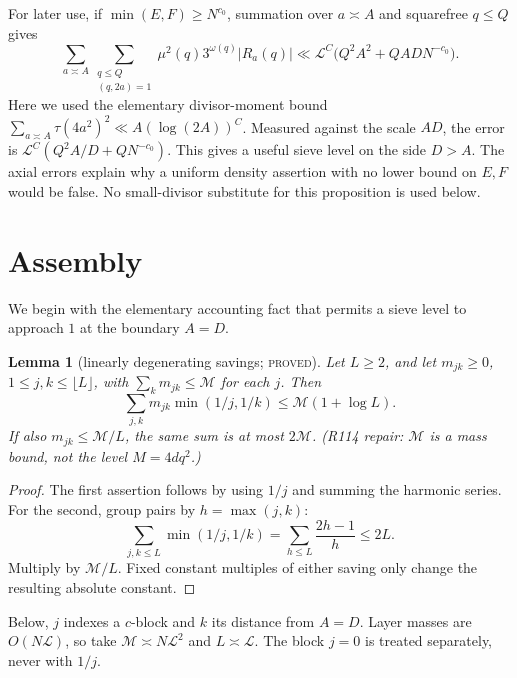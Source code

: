 \documentclass[10pt,reqno]{amsart}
\newtheorem{lemma}[theorem]{Lemma}
\theoremstyle{definition}
\numberwithin{equation}{section}
\newcommand{\cL}{\mathcal L}
\newcommand{\status}[1]{\textup{\textsc{#1}}}
\begin{document}
For later use, if $\min(E,F)\geq N^{c_0}$, summation over $a\asymp A$
and squarefree $q\leq Q$ gives
\begin{equation}\label{C:eq:Ka-summed}
 \sum_{a\asymp A}\sum_{\substack{q\leq Q\\(q,2a)=1}}
 \mu^2(q)3^{\omega(q)}|R_a(q)|
 \ll\cL^C\bigl(Q^2A^2+QADN^{-c_0}\bigr).
\end{equation}
Here we used the elementary divisor-moment bound
$\sum_{a\asymp A}\tau(4a^2)^2\ll A(\log(2A))^C$.
Measured against the scale $AD$, the error is
$\cL^C(Q^2A/D+QN^{-c_0})$.  This gives a useful sieve level on the
side $D>A$.  The axial errors explain why a uniform density assertion
with no lower bound on $E,F$ would be false.  No small-divisor substitute
for this proposition is used below.

\section{Assembly}\label{sec:assembly}
We begin with the elementary accounting fact that permits a sieve level
to approach $1$ at the boundary $A=D$.

\begin{lemma}[linearly degenerating savings; \status{proved}]\label{L:1.1}
Let $L\geq2$, and let $m_{jk}\geq0$, $1\leq j,k\leq\lfloor L\rfloor$,
with $\sum_km_{jk}\leq\mathcal M$ for each $j$.  Then
\[
 \sum_{j,k}m_{jk}\min(1/j,1/k)\leq\mathcal M(1+\log L).
\]
If also $m_{jk}\leq\mathcal M/L$, the same sum is at most $2\mathcal M$.
(R114 repair: $\mathcal M$ is a mass bound, not the level $M=4dq^2$.)
\end{lemma}
\begin{proof}
The first assertion follows by using $1/j$ and summing the harmonic
series.  For the second, group pairs by $h=\max(j,k)$:
\[
 \sum_{j,k\leq L}\min(1/j,1/k)
 =\sum_{h\leq L}\frac{2h-1}{h}\leq2L.
\]
Multiply by $\mathcal M/L$.  Fixed constant multiples of either saving only
change the resulting absolute constant.
\end{proof}
Below, $j$ indexes a $c$-block and $k$ its distance from $A=D$.
Layer masses are $O(N\cL)$, so take $\mathcal M\asymp N\cL^2$ and $L\asymp\cL$.
The block $j=0$ is treated separately, never with $1/j$.
\end{document}
